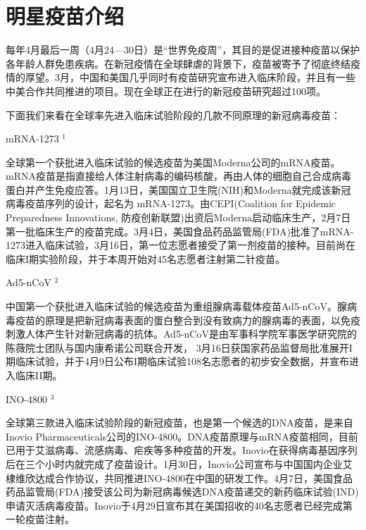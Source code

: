 \documentclass[
]{article}
\begin{document}
\vspace{-5mm}

\hypertarget{section}{%
\section{\texorpdfstring{\textcolor{glaucous}{\Huge 明星疫苗介绍}}{}}\label{section}}

\vspace{-3mm}

每年4月最后一周（4月24---30日）是``世界免疫周''，其目的是促进接种疫苗以保护各年龄人群免患疾病。在新冠疫情在全球肆虐的背景下，疫苗被寄予了彻底终结疫情的厚望。3月，中国和美国几乎同时有疫苗研究宣布进入临床阶段，并且有一些中美合作共同推进的项目。现在全球正在进行的新冠疫苗研究超过100项。

下面我们来看在全球率先进入临床试验阶段的几款不同原理的新冠病毒疫苗：

\centerline{mRNA-1273 $^1$}

全球第一个获批进入临床试验的候选疫苗为美国Moderna公司的mRNA疫苗。mRNA疫苗是指直接给人体注射病毒的编码核酸，再由人体的细胞自己合成病毒蛋白并产生免疫应答。1月13日，美国国立卫生院(NIH)和Moderna就完成该新冠病毒疫苗序列的设计，起名为
mRNA-1273。由CEPI(Coalition for Epidemic Preparedness Innovations,
防疫创新联盟)出资后Moderna启动临床生产，2月7日第一批临床生产的疫苗完成。3月4日，美国食品药品监管局(FDA)批准了mRNA-1273进入临床试验，3月16日，第一位志愿者接受了第一剂疫苗的接种。目前尚在临床I期实验阶段，并于本周开始对45名志愿者注射第二针疫苗。

\centerline{Ad5-nCoV $^2$}

中国第一个获批进入临床试验的候选疫苗为重组腺病毒载体疫苗Ad5-nCoV。腺病毒疫苗的原理是把新冠病毒表面的蛋白整合到没有致病力的腺病毒的表面，以免疫刺激人体产生针对新冠病毒的抗体。Ad5-nCoV是由军事科学院军事医学研究院的陈薇院士团队与国内康希诺公司联合开发，
3月16日获国家药品监督局批准展开I期临床试验，并于4月9日公布I期临床试验108名志愿者的初步安全数据，并宣布进入临床II期。

\centerline{INO-4800 $^3$}

全球第三款进入临床试验阶段的新冠疫苗，也是第一个候选的DNA疫苗，是来自Inovio
Pharmaceuticals公司的INO-4800。DNA疫苗原理与mRNA疫苗相同，目前已用于艾滋病毒、流感病毒、疟疾等多种疫苗的开发。Inovio在获得病毒基因序列后在三个小时内就完成了疫苗设计。1月30日，Inovio公司宣布与中国国内企业艾棣维欣达成合作协议，共同推进INO-4800在中国的研发工作。4月7日，美国食品药品监管局(FDA)接受该公司为新冠病毒候选DNA疫苗递交的新药临床试验(IND)申请灭活病毒疫苗。Inovio于4月29日宣布其在美国招收的40名志愿者已经完成第一轮疫苗注射。
\end{document}
